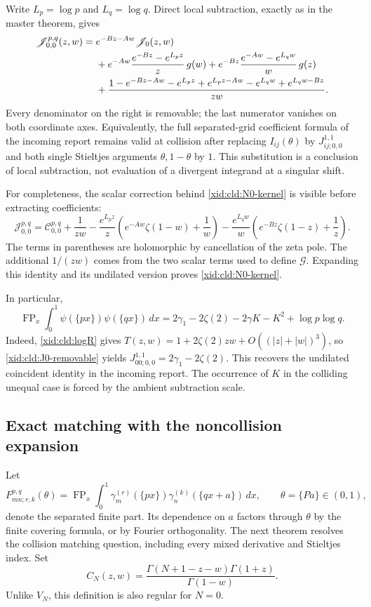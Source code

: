 \documentclass[11pt,a4paper]{article}
\numberwithin{equation}{section}
\theoremstyle{definition}
\theoremstyle{remark}
\DeclareMathOperator{\FP}{FP}
\begin{document}
Write $L_p=\log p$ and $L_q=\log q$.  Direct local subtraction, exactly
as in the master theorem, gives
\begin{align}
 \mathscr J_{0,0}^{p,q}(z,w)
 ={}&e^{-Bz-Aw}\mathscr J_0(z,w)\notag\\
 &+e^{-Aw}\frac{e^{-Bz}-e^{L_pz}}z\,g(w)
  +e^{-Bz}\frac{e^{-Aw}-e^{L_qw}}w\,g(z)\notag\\
 &+\frac{1-e^{-Bz-Aw}-e^{L_pz}+e^{L_pz-Aw}
                       -e^{L_qw}+e^{L_qw-Bz}}{zw}.
 \label{xid:cld:N0-kernel}
\end{align}
Every denominator on the right is removable; the last numerator vanishes
on both coordinate axes.  Equivalently, the full separated-grid
coefficient formula of the incoming report remains valid at collision
after replacing $I_{ij}(\theta)$ by $J_{ij;0,0}^{1,1}$ and both single
Stieltjes arguments $\theta,1-\theta$ by $1$.  This substitution is a
conclusion of local subtraction, not evaluation of a divergent integrand
at a singular shift.

For completeness, the scalar correction behind
\eqref{xid:cld:N0-kernel} is visible before extracting coefficients:
\[
 \mathscr J_{0,0}^{p,q}
 =\mathscr C_{0,0}^{p,q}+\frac1{zw}
  -\frac{e^{L_pz}}z\left(e^{-Aw}\zeta(1-w)+\frac1w\right)
  -\frac{e^{L_qw}}w\left(e^{-Bz}\zeta(1-z)+\frac1z\right).
\]
The terms in parentheses are holomorphic by cancellation of the zeta
pole.  The additional $1/(zw)$ comes from the two scalar terms used to
define $\mathscr G$.  Expanding this identity and its undilated version
proves \eqref{xid:cld:N0-kernel}.

In particular,
\begin{equation}
 \operatorname{FP}_x\int_0^1\psi(\{px\})\psi(\{qx\})\,dx
 =2\gamma_1-2\zeta(2)-2\gamma K-K^2+\log p\log q.
 \label{xid:cld:digamma}
\end{equation}
Indeed, \eqref{xid:cld:logR} gives
$T(z,w)=1+2\zeta(2)zw+O((|z|+|w|)^3)$, so
\eqref{xid:cld:J0-removable} yields $J_{00;0,0}^{1,1}=2\gamma_1-2\zeta(2)$.
This recovers the undilated coincident identity in the incoming report.
The occurrence of $K$ in the colliding unequal case is forced by the
ambient subtraction scale.

\subsection{Exact matching with the noncollision expansion}

Let
\[
 F_{mn;r,k}^{p,q}(\theta)=\FP_x\int_0^1
 \gamma_m^{(r)}(\{px\})\gamma_n^{(k)}(\{qx+a\})\,dx,
 \qquad \theta=\{Pa\}\in(0,1),
\]
denote the separated finite part. Its dependence on $a$ factors through
$\theta$ by the finite covering formula, or by Fourier orthogonality.  The next theorem resolves the collision
matching question, including every mixed derivative and Stieltjes index.
Set
\[
 C_N(z,w)=\frac{\Gamma(N+1-z-w)\Gamma(1+z)}{\Gamma(1-w)}.
\]
Unlike $V_N$, this definition is also regular for $N=0$.
\end{document}
